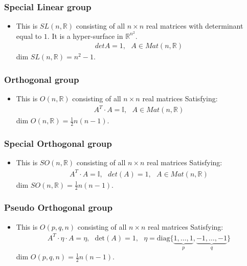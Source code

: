 \documentclass[11pt]{article}
\numberwithin{equation}{section}
\DeclareRobustCommand{\RR}{\mathbb{R}}
\begin{document}
    \subsubsection{Special Linear group}
    \begin{itemize}
      \item This is $SL(n,\RR)$ consisting of all $n \times n$ real matrices with determinant equal to $1$. It is a hyper-surface in $\RR^{n^2}$.  
\begin{align*}
det A =1,~~~A \in Mat(n,\RR)
\end{align*}
      dim $ SL(n,\RR) = n^2-1$.
    \end{itemize}


       \subsubsection{Orthogonal group}
    \begin{itemize}
      \item This is $O(n,\RR)$ consisting of all $n \times n$ real matrices Satisfying:  
      \begin{align*}
A^T \cdot A = \mathbb{I},~~~A \in Mat(n,\RR)
\end{align*}
dim $O(n,\RR) = \frac{1}{2}n(n-1)$.
    \end{itemize}

\subsubsection{Special Orthogonal group}
    \begin{itemize}
      \item This is $SO(n,\RR)$ consisting of all $n \times n$ real matrices Satisfying:  
      \begin{align*}
A^T \cdot A = \mathbb{I},~~~det(A)=1,~~~A \in Mat(n,\RR)
\end{align*}
dim $SO(n,\RR) = \frac{1}{2}n(n-1)$.
    \end{itemize}

  \subsubsection{Pseudo Orthogonal group}
    \begin{itemize}
      \item This is $O(p,q,n)$ consisting of all $n \times n$ real matrices Satisfying:  
      \begin{align*}
A^T \cdot \eta \cdot A = \eta,~~~\text{det}(A)=1,~~~\eta = \text{diag}\{\underbrace{1,\ldots,1}_{p},\underbrace{-1,\ldots,-1}_{q}\}
\end{align*}
dim $O(p,q,n) = \frac{1}{2}n(n-1)$.
    \end{itemize}
\end{document}
